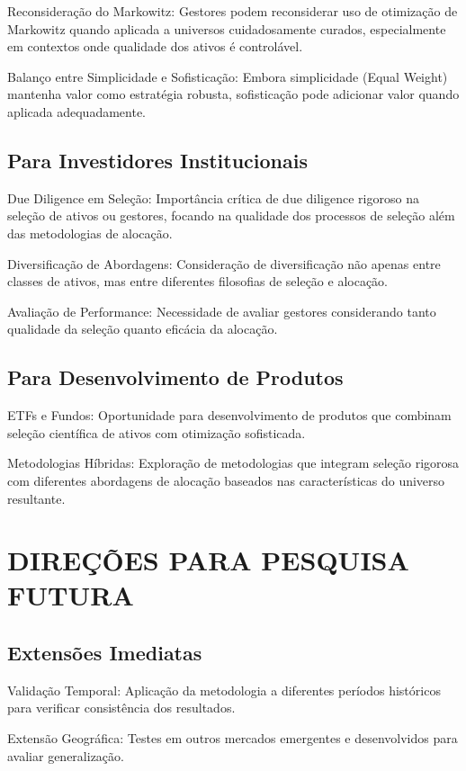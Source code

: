 Reconsideração do Markowitz: Gestores podem reconsiderar uso de otimização de Markowitz quando aplicada a universos cuidadosamente curados, especialmente em contextos onde qualidade dos ativos é controlável.

Balanço entre Simplicidade e Sofisticação: Embora simplicidade (Equal Weight) mantenha valor como estratégia robusta, sofisticação pode adicionar valor quando aplicada adequadamente.

\subsection{Para Investidores Institucionais}

Due Diligence em Seleção: Importância crítica de due diligence rigoroso na seleção de ativos ou gestores, focando na qualidade dos processos de seleção além das metodologias de alocação.

Diversificação de Abordagens: Consideração de diversificação não apenas entre classes de ativos, mas entre diferentes filosofias de seleção e alocação.

Avaliação de Performance: Necessidade de avaliar gestores considerando tanto qualidade da seleção quanto eficácia da alocação.

\subsection{Para Desenvolvimento de Produtos}

ETFs e Fundos: Oportunidade para desenvolvimento de produtos que combinam seleção científica de ativos com otimização sofisticada.

Metodologias Híbridas: Exploração de metodologias que integram seleção rigorosa com diferentes abordagens de alocação baseados nas características do universo resultante.

\section{DIREÇÕES PARA PESQUISA FUTURA}

\subsection{Extensões Imediatas}

Validação Temporal: Aplicação da metodologia a diferentes períodos históricos para verificar consistência dos resultados.

Extensão Geográfica: Testes em outros mercados emergentes e desenvolvidos para avaliar generalização.

